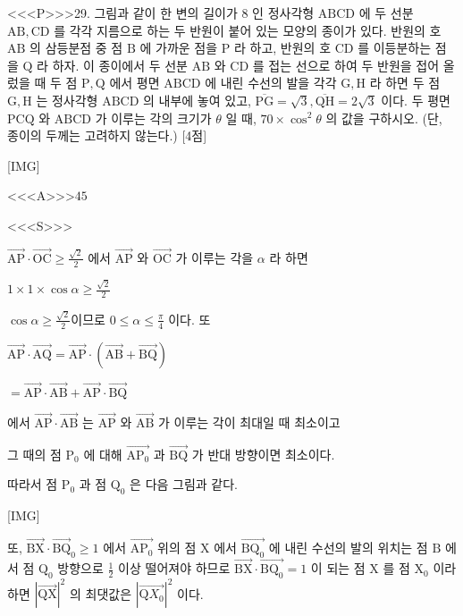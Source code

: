 \documentclass{oblivoir}
\begin{document}
<<<P>>>29. 그림과 같이 한 변의 길이가 8 인 정사각형 $\mathrm{ABCD}$ 에 두 선분 $\mathrm{AB}, \mathrm{CD}$ 를 각각 지름으로 하는 두 반원이 붙어 있는 모양의 종이가 있다. 반원의 호 $\mathrm{AB}$ 의 삼등분점 중 점 $\mathrm{B}$ 에 가까운 점을 $\mathrm{P}$ 라 하고, 반원의 호 $\mathrm{CD}$ 를 이등분하는 점을 $\mathrm{Q}$ 라 하자. 이 종이에서 두 선분 $\mathrm{AB}$ 와 $\mathrm{CD}$ 를 접는 선으로 하여 두 반원을 접어 올렀을 때 두 점 $\mathrm{P}, \mathrm{Q}$ 에서 평면 $\mathrm{ABCD}$ 에 내린 수선의 발을 각각 $\mathrm{G}, \mathrm{H}$ 라 하면 두 점 $\mathrm{G}, \mathrm{H}$ 는 정사각형 $\mathrm{ABCD}$ 의 내부에 놓여 있고, $\overline{\mathrm{PG}}=\sqrt{3}, \overline{\mathrm{QH}}=2 \sqrt{3}$ 이다. 두 평면 $\mathrm{PCQ}$ 와 $\mathrm{ABCD}$ 가 이루는 각의 크기가 $\theta$ 일 때, $70 \times \cos ^{2} \theta$ 의 값을 구하시오. (단, 종이의 두께는 고려하지 않는다.) [4점]


[IMG]


<<<A>>>$45$

<<<S>>>



$\overrightarrow{\mathrm{AP}} \cdot \overrightarrow{\mathrm{OC}} \geq \frac{\sqrt{2}}{2}$ 에서 $\overrightarrow{\mathrm{AP}}$ 와 $\overrightarrow{\mathrm{OC}}$ 가 이루는
각을 $\alpha$ 라 하면

$1 \times 1 \times \cos \alpha \geq \frac{\sqrt{2}}{2} $

$\cos \alpha \geq \frac{\sqrt{2}}{2}$이므로 $0 \leq \alpha \leq \frac{\pi}{4}$ 이다. 또

$\overrightarrow{\mathrm{AP}} \cdot \overrightarrow{\mathrm{AQ}}=\overrightarrow{\mathrm{AP}} \cdot(\overrightarrow{\mathrm{AB}}+\overrightarrow{\mathrm{BQ}})$

$=\overrightarrow{\mathrm{AP}} \cdot \overrightarrow{\mathrm{AB}}+\overrightarrow{\mathrm{AP}} \cdot \overrightarrow{\mathrm{BQ}}$

에서 $\overrightarrow{\mathrm{AP}} \cdot \overrightarrow{\mathrm{AB}}$ 는 $\overrightarrow{\mathrm{AP}}$ 와 $\overrightarrow{\mathrm{AB}}$ 가 이루는 각이 최대일 때 최소이고

그 때의 점 $\mathrm{P}_{0}$ 에 대해 $\overrightarrow{\mathrm{AP}_{0}}$ 과 $\overrightarrow{\mathrm{BQ}}$ 가 반대 방향이면 최소이다.

따라서 점 $\mathrm{P}_{0}$ 과 점 $\mathrm{Q}_{0}$ 은 다음 그림과 같다.

[IMG]

또, $\overrightarrow{\mathrm{BX}} \cdot \overrightarrow{\mathrm{BQ}}_{0} \geq 1$ 에서 $\overrightarrow{\mathrm{AP}_{0}}$ 위의 점 $\mathrm{X}$ 에서 $\overrightarrow{\mathrm{BQ}_{0}}$ 에 내린 수선의 발의 위치는 점 $\mathrm{B}$ 에서 점 $\mathrm{Q}_{0}$ 방향으로 $\frac{1}{2}$ 이상 떨어져야 하므로
$\overrightarrow{\mathrm{BX}} \cdot \overrightarrow{\mathrm{BQ}_{0}}=1$ 이 되는 점 $\mathrm{X}$ 를 점 $\mathrm{X}_{0}$ 이라 하면 $|\overrightarrow{\mathrm{QX}}|^{2}$ 의 최댓값은 $\left|\overrightarrow{\mathrm{Q} X_{0}}\right|^{2}$ 이다.
\end{document}
